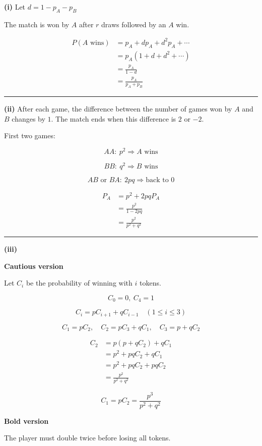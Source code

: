 \documentclass[12pt]{article}
\begin{document}
\newcommand{\ds}{\displaystyle}

\textbf{(i)} Let $\ds d=1-p_A-p_B$

The match is won by $A$ after $r$ draws followed by an $A$ win.

\begin{align*}
P(A\text{ wins})
&=p_A+dp_A+d^2p_A+\cdots\\
&=p_A(1+d+d^2+\cdots)\\
&=\frac{p_A}{1-d}\\
&=\frac{p_A}{p_A+p_B}
\end{align*}

\bigskip\hrule\bigskip

\textbf{(ii)} After each game, the difference between the number of games won by $A$ and $B$ changes by $1$. The match ends when this difference is $2$ or $-2$.

First two games:

$$AA:\ p^2\Rightarrow A\text{ wins}$$

$$BB:\ q^2\Rightarrow B\text{ wins}$$

$$AB\text{ or }BA:\ 2pq\Rightarrow \text{back to }0$$

\begin{align*}
P_{A}&=p^2+2pqP_{A}\\
&=\frac{p^2}{1-2pq}\\
&=\frac{p^2}{p^2+q^2}
\end{align*}

\bigskip\hrule\bigskip

\textbf{(iii)}

\textbf{Cautious version}

Let $C_i$ be the probability of winning with $i$ tokens.

$$C_0=0,\  C_4=1$$

$$C_i=pC_{i+1}+qC_{i-1}\quad (1\leq i\leq3)$$

$$C_1=pC_2,\quad C_2=pC_3+qC_1,\quad C_3=p+qC_2$$


\begin{align*}
C_2&=p(p+qC_2)+qC_1\\
&=p^2+pqC_2+qC_1\\
&=p^2+pqC_2+pqC_2\\
&=\frac{p^2}{p^2+q^2}
\end{align*}

$$C_1=pC_2=\frac{p^3}{p^2+q^2}$$

\textbf{Bold version}

The player must double twice before losing all tokens.
\end{document}
